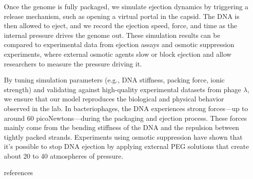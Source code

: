 \documentclass[12pt]{article}
\begin{document}
\begin{flushleft}
Once the genome is fully packaged, we simulate ejection dynamics by triggering a release mechanism, such as opening a virtual portal in the capsid. The DNA is then allowed to eject, and we record the ejection speed, force, and time as the internal pressure drives the genome out. These simulation results can be compared to experimental data from ejection assays and osmotic suppression experiments, where external osmotic agents slow or block ejection and allow researchers to measure the pressure driving it.


By tuning simulation parameters (e.g., DNA stiffness, packing force, ionic strength) and validating against high-quality experimental datasets from phage $\lambda$, we ensure that our model reproduces the biological and physical behavior observed in the lab. In bacteriophages, the DNA experiences strong forces—up to around 60 picoNewtons—during the packaging and ejection process. These forces mainly come from the bending stiffness of the DNA and the repulsion between tightly packed strands. Experiments using osmotic suppression have shown that it's possible to stop DNA ejection by applying external PEG solutions that create about 20 to 40 atmospheres of pressure\cite{Grayson2006}.




\end{flushleft}

 {references}  
\end{document}
